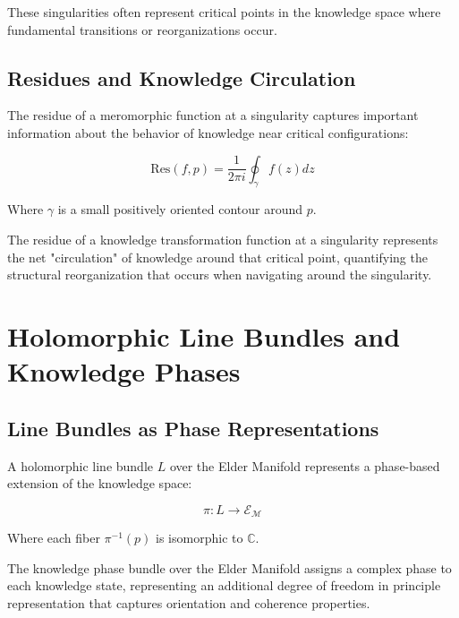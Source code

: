 These singularities often represent critical points in the knowledge space where fundamental transitions or reorganizations occur.

\subsection{Residues and Knowledge Circulation}

The residue of a meromorphic function at a singularity captures important information about the behavior of knowledge near critical configurations:

\begin{equation}
\text{Res}(f, p) = \frac{1}{2\pi i}\oint_{\gamma} f(z) dz
\end{equation}

Where $\gamma$ is a small positively oriented contour around $p$.

\begin{theorem}
The residue of a knowledge transformation function at a singularity represents the net "circulation" of knowledge around that critical point, quantifying the structural reorganization that occurs when navigating around the singularity.
\end{theorem}

\section{Holomorphic Line Bundles and Knowledge Phases}

\subsection{Line Bundles as Phase Representations}

A holomorphic line bundle $L$ over the Elder Manifold represents a phase-based extension of the knowledge space:

\begin{equation}
\pi: L \rightarrow \mathcal{E}_{\mathcal{M}}
\end{equation}

Where each fiber $\pi^{-1}(p)$ is isomorphic to $\mathbb{C}$.

\begin{definition}
The knowledge phase bundle over the Elder Manifold assigns a complex phase to each knowledge state, representing an additional degree of freedom in principle representation that captures orientation and coherence properties.
\end{definition}

